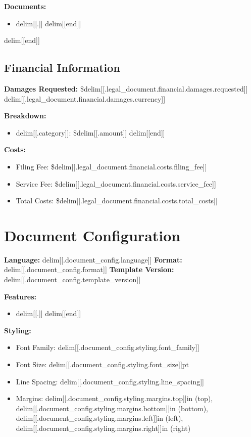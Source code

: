 \documentclass[12pt,a4paper]{article}
\begin{document}
\textbf{Documents:}
\begin{itemize}
delim[[range .documents]]
    \item delim[[.]]
delim[[end]]
\end{itemize}
delim[[end]]

\subsection{Financial Information}

\textbf{Damages Requested:} \$delim[[.legal_document.financial.damages.requested]] delim[[.legal_document.financial.damages.currency]]

\textbf{Breakdown:}
\begin{itemize}
delim[[range .legal_document.financial.damages.breakdown]]
    \item delim[[.category]]: \$delim[[.amount]]
delim[[end]]
\end{itemize}

\textbf{Costs:}
\begin{itemize}
    \item Filing Fee: \$delim[[.legal_document.financial.costs.filing_fee]]
    \item Service Fee: \$delim[[.legal_document.financial.costs.service_fee]]
    \item Total Costs: \$delim[[.legal_document.financial.costs.total_costs]]
\end{itemize}

\section{Document Configuration}

\textbf{Language:} delim[[.document_config.language]]
\textbf{Format:} delim[[.document_config.format]]
\textbf{Template Version:} delim[[.document_config.template_version]]

\textbf{Features:}
\begin{itemize}
delim[[range .document_config.features]]
    \item delim[[.]]
delim[[end]]
\end{itemize}

\textbf{Styling:}
\begin{itemize}
    \item Font Family: delim[[.document_config.styling.font_family]]
    \item Font Size: delim[[.document_config.styling.font_size]]pt
    \item Line Spacing: delim[[.document_config.styling.line_spacing]]
    \item Margins: delim[[.document_config.styling.margins.top]]in (top), delim[[.document_config.styling.margins.bottom]]in (bottom), delim[[.document_config.styling.margins.left]]in (left), delim[[.document_config.styling.margins.right]]in (right)
\end{itemize}
\end{document}
